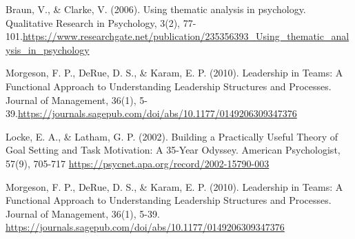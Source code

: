 \begin{enumerate}[label={[\arabic*]}]
        \item \label{itm:seventh} Braun, V., \& Clarke, V. (2006). Using thematic analysis in psychology. Qualitative Research in Psychology, 3(2), 77-101.\url{https://www.researchgate.net/publication/235356393_Using_thematic_analysis_in_psychology}

         \item \label{itm:eight}Morgeson, F. P., DeRue, D. S., \& Karam, E. P. (2010). Leadership in Teams: A Functional Approach to Understanding Leadership Structures and Processes. Journal of Management, 36(1), 5-39.\url{https://journals.sagepub.com/doi/abs/10.1177/0149206309347376}

         \item \label{itm:ninth}Locke, E. A., \& Latham, G. P. (2002). Building a Practically Useful Theory of Goal Setting and Task Motivation: A 35-Year Odyssey. American Psychologist, 57(9), 705-717 \url{https://psycnet.apa.org/record/2002-15790-003}

         \item \label{itm:tenth}Morgeson, F. P., DeRue, D. S., \& Karam, E. P. (2010). Leadership in Teams: A Functional Approach to Understanding Leadership Structures and Processes. Journal of Management, 36(1), 5-39. \url{https://journals.sagepub.com/doi/abs/10.1177/0149206309347376}
  
    \end{enumerate}